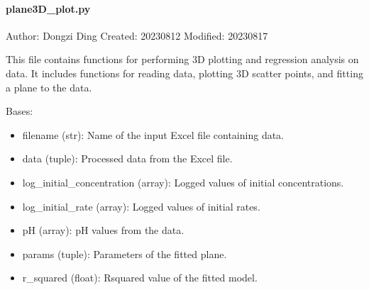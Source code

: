 \documentclass[a4paper,10pt,english]{sphinxmanual}
\begin{document}
\paragraph{plane3D\_plot.py}
\label{\detokenize{utils:plane3d-plot-py}}
\sphinxAtStartPar
Author: Dongzi Ding
Created: 2023\sphinxhyphen{}08\sphinxhyphen{}12
Modified: 2023\sphinxhyphen{}08\sphinxhyphen{}17

\sphinxAtStartPar
This file contains functions for performing 3D plotting and regression analysis on data.
It includes functions for reading data, plotting 3D scatter points, and fitting a plane to the data.

\begin{fulllineitems}
\label{\detokenize{utils:src.utils.plane3D_plot.Plane3DPlotter}}
\pysigstartsignatures
{}
\pysigstopsignatures
\sphinxAtStartPar
Bases: 
\begin{description}
\begin{itemize}
\item {} 
\sphinxAtStartPar
filename (str): Name of the input Excel file containing data.

\item {} 
\sphinxAtStartPar
data (tuple): Processed data from the Excel file.

\item {} 
\sphinxAtStartPar
log\_initial\_concentration (array): Logged values of initial concentrations.

\item {} 
\sphinxAtStartPar
log\_initial\_rate (array): Logged values of initial rates.

\item {} 
\sphinxAtStartPar
pH (array): pH values from the data.

\item {} 
\sphinxAtStartPar
params (tuple): Parameters of the fitted plane.

\item {} 
\sphinxAtStartPar
r\_squared (float): R\sphinxhyphen{}squared value of the fitted model.


\end{itemize}
\end{description}
\end{fulllineitems}
\end{document}
